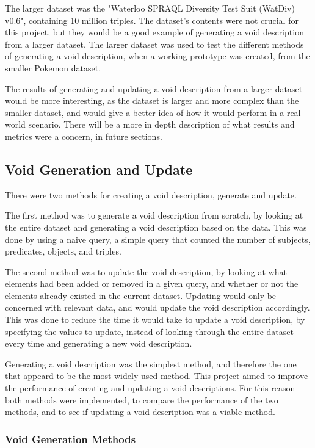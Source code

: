 The larger dataset was the "Waterloo SPRAQL Diversity Test Suit (WatDiv) v0.6", containing 10 million triples. The dataset's contents were not crucial for this project, but they would be a good example of generating a void description from a larger dataset. The larger dataset was used to test the different methods of generating a \gls{void} description, when a working prototype was created, from the smaller Pokemon dataset.

The results of generating and updating a \gls{void} description from a larger dataset would be more interesting, as the dataset is larger and more complex than the smaller dataset, and would give a better idea of how it would perform in a real-world scenario. There will be a more in depth description of what results and metrics were a concern, in future sections.

\subsection{Void Generation and Update}\label{sec:void}
There were two methods for creating a \gls{void} description, generate and update.

The first method was to generate a \gls{void} description from scratch, by looking at the entire dataset and generating a \gls{void} description based on the data. This was done by using a naive query, a simple query that counted the number of subjects, predicates, objects, and triples.

The second method was to update the \gls{void} description, by looking at what elements had been added or removed in a given query, and whether or not the elements already existed in the current dataset. Updating would only be concerned with relevant data, and would update the \gls{void} description accordingly. This was done to reduce the time it would take to update a \gls{void} description, by specifying the values to update, instead of looking through the entire dataset every time and generating a new \gls{void} description.

Generating a \gls{void} description was the simplest method, and therefore the one that appeard to be the most widely used method. This project aimed to improve the performance of creating and updating a \gls{void} descriptions. For this reason both methods were implemented, to compare the performance of the two methods, and to see if updating a \gls{void} description was a viable method.
\subsubsection{Void Generation Methods}\label{sec:voidmethods}


